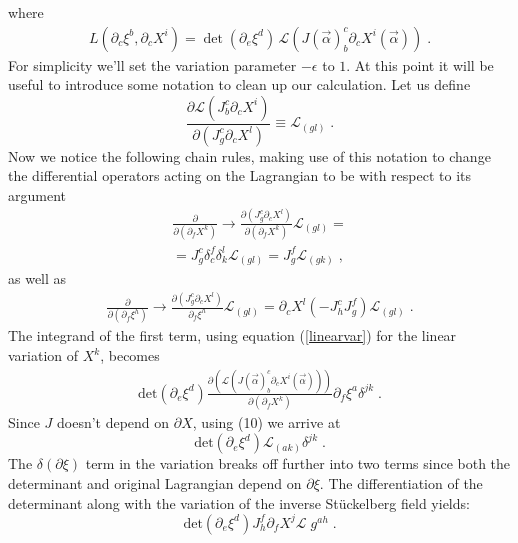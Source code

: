 \documentclass[%
 reprint,
 amsmath,amssymb,
 aps,
]{revtex4-1}
\begin{document}
where
\begin{eqnarray}
    L(\partial_c \xi^b, \partial_c X^i) = \mathrm{\det}( \partial_e \xi^d )
    \, \mathcal{L}( J(\vec{\alpha})^c_b \partial_c X^i(\vec{\alpha}) )\;.  \nonumber
\end{eqnarray}
For simplicity we'll set the variation parameter $-\epsilon$ to $1$.
At this point it will be useful to introduce some notation to clean up our calculation.  Let us define
\begin{equation}
    \frac{\partial \mathcal{L}(J^c_b \partial_c X^i)}{\partial (J^c_g \partial_c X^l)} \equiv \mathcal{L}_{(g l)} \; . \nonumber
\end{equation}
Now we notice the following chain rules, making use of this notation to change the differential operators acting
on the Lagrangian to be with respect to its argument
\begin{gather}
    \frac{\partial}{\partial(\partial_f X^k)} \rightarrow
    \frac{\partial(J^c_g \partial_c X^l)}{\partial (\partial_f X^k)}
    \mathcal{L}_{(g l)} = \nonumber \\
    = J^c_g \delta^f_c \delta^l_k \mathcal{L}_{(g l)}= J^f_g \mathcal{L}_{(g k)} \; ,
\end{gather}
as well as
\begin{gather}
\label{chainrulexi}
    \frac{\partial}{\partial (\partial_f \xi^h)} \rightarrow
    \frac{\partial (J^c_g \partial_c X^l)}{\partial_f \xi^h} \mathcal{L}_{(g l)}
    = \partial_c X^l (-J^c_h J^f_g)  \mathcal{L}_{(g l)} \; .
\end{gather}
The integrand of the first term, using equation (\ref{linearvar}) for
the linear variation of $X^k$, becomes
\begin{eqnarray}
    \mathrm{det}(\partial_e \xi^d)
    \frac{\partial \left(
    \mathcal{L}( J(\vec{\alpha})^c_b \partial_c X^i(\vec{\alpha}) )
    \right)}{\partial \left(  \partial_f X^k \right)} \partial_f \xi^a \delta^{j k} \; . \nonumber
\end{eqnarray}
Since $J$ doesn't depend on $\partial X$, using (10) we arrive at
\begin{equation}
\label{term1}
    \mathrm{det} ( \partial_e \xi^d ) \mathcal{L}_{(a k)} \delta^{j k} \; .
\end{equation}
The $\delta (\partial\xi)$ term in the variation breaks off further into two terms since both the determinant and original
Lagrangian depend on $\partial \xi$. The differentiation of the determinant along with the variation of the inverse
St\"uckelberg field yields:
\begin{equation}
\label{term2}
    \mathrm{det} ( \partial_e \xi^d ) J^f_h \partial_f X^j \mathcal{L} \; g^{a h} \; .
\end{equation}
\end{document}
